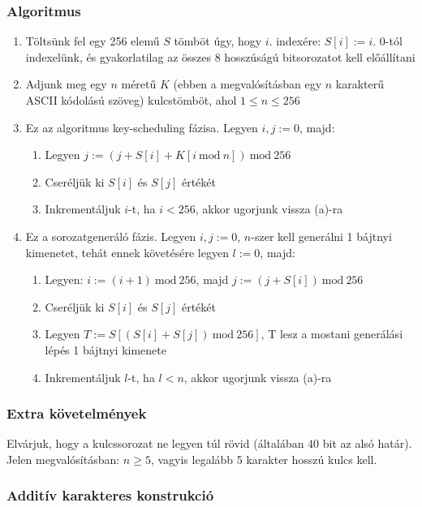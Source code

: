 \documentclass[12pt]{article}
\begin{document}
	\subsubsection*{Algoritmus}
	\begin{enumerate}
		\item Töltsünk fel egy 256 elemű $S$ tömböt úgy, hogy $i$. indexére: $S[i]:=i$. 0-tól indexelünk, és gyakorlatilag az összes 8 hosszúságú bitsorozatot kell előállítani
		\item Adjunk meg egy $n$ méretű $K$ (ebben a megvalósításban egy $n$ karakterű ASCII kódolású szöveg) kulcstömböt, ahol $1 \leq n \leq 256$
		\item Ez az algoritmus key-scheduling fázisa. Legyen $i, j:=0$, majd:
			\begin{enumerate}
				\item Legyen $j:=(j+S[i]+K[i \ \textrm{mod}\ n]) \ \textrm{mod} \ 256$
				\item Cseréljük ki $S[i]$ és $S[j]$ értékét
				\item Inkrementáljuk $i$-t, ha $i < 256$, akkor ugorjunk vissza (a)-ra
			\end{enumerate}
		\item Ez a sorozatgeneráló fázis. Legyen $i, j := 0$, $n$-szer kell generálni 1 bájtnyi kimenetet, tehát ennek követésére legyen $l:=0$, majd:
		\begin{enumerate}
			\item Legyen: $i := (i+1) \ \textrm{mod} \ 256$, majd $j := (j + S[i]) \ \textrm{mod} \ 256$
			\item Cseréljük ki $S[i]$ és $S[j]$ értékét
			\item Legyen $T := S[(S[i] + S[j]) \ \textrm{mod} \ 256]$, T lesz a mostani generálási lépés 1 bájtnyi kimenete
			\item Inkrementáljuk $l$-t, ha $l < n$, akkor ugorjunk vissza (a)-ra
		\end{enumerate}
	\end{enumerate}
	\subsubsection*{Extra követelmények}
	Elvárjuk, hogy a kulcssorozat ne legyen túl rövid (általában 40 bit az alsó határ). Jelen megvalósításban: $n \geq 5$, vagyis legalább 5 karakter hosszú kulcs kell.
	\subsubsection{Additív karakteres konstrukció}
\end{document}
